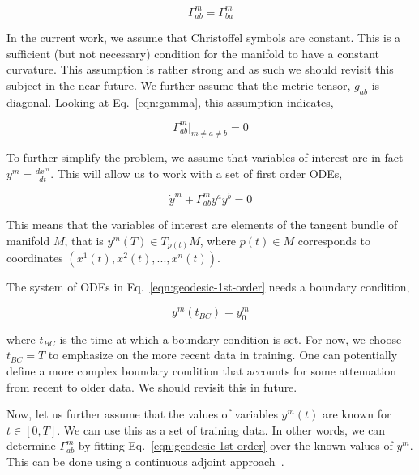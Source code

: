 \documentclass{article}
\begin{document}
\begin{equation}\label{eqn:gamma-symmetry}
\Gamma^{m}_{ab} = \Gamma^{m}_{ba}
\end{equation}

In the current work, we assume that Christoffel symbols are
constant. This is a sufficient (but not necessary) condition for the
manifold to have a constant curvature. This assumption is rather
strong and as such we should revisit this subject in the near
future. We further assume that the metric tensor, $g_{ab}$ is
diagonal. Looking at Eq.~\ref{eqn:gamma}, this assumption indicates,

\begin{equation}\label{eqn:gamma-diagonal-metric}
\Gamma^{m}_{ab}|_{m \ne a \ne b} = 0
\end{equation}

To further simplify the problem, we assume that variables of interest
are in fact $y^{m} = \frac{dx^{m}}{dt}$. This will allow us to work
with a set of first order ODEs,

\begin{equation}\label{eqn:geodesic-1st-order}
\dot{y}^{m} + \Gamma^{m}_{ab} y^{a} y^{b} = 0
\end{equation}

This means that the variables of interest are elements of the tangent
bundle of manifold $M$, that is $y^{m}(T) \in T_{p(t)}M$, where $p(t)
\in M$ corresponds to coordinates $(x^{1}(t),x^{2}(t),...,x^{n}(t))$.

The system of ODEs in Eq.~\ref{eqn:geodesic-1st-order} needs a
boundary condition,

\begin{equation}\label{eqn:geodesic-bc}
y^{m}(t_{BC}) = y^{m}_{0}
\end{equation}

where $t_{BC}$ is the time at which a boundary condition is set. For
now, we choose $t_{BC} = T$ to emphasize on the more recent data in
training. One can potentially define a more complex boundary condition
that accounts for some attenuation from recent to older data. We
should revisit this in future.

Now, let us further assume that the values of variables $y^{m}(t)$ are
known for $t \in [0,T]$. We can use this as a set of training data. In
other words, we can determine $\Gamma^{m}_{ab}$ by fitting
Eq.~\ref{eqn:geodesic-1st-order} over the known values of
$y^{m}$. This can be done using a continuous adjoint
approach~\cite{ref:adjoint-giles}.
\end{document}
